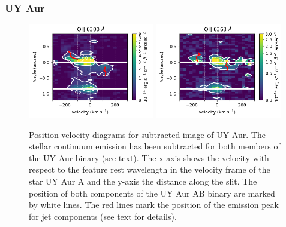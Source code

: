 \documentclass[twocolumn,trackchanges]{aastex63}
\begin{document}
\subsubsection{UY Aur}
\begin{figure}[h!]
\begin{center}
\includegraphics[width=0.49\textwidth]{UY_Aur_6300.png}
\includegraphics[width=0.49\textwidth]{UY_Aur_6363.png}
\caption{Position velocity diagrams for subtracted
image of UY Aur. The stellar continuum emission has been subtracted for both members of the UY Aur binary (see text). The x-axis shows the velocity with respect to the
feature rest wavelength in the velocity frame of the star UY Aur
A and the y-axis the distance along the slit. The position of both components of the UY Aur AB
binary are marked by white lines. The red lines mark the position of the emission peak for jet components (see text for details).
\label{fig:UYAur}
}
\end{center}
\end{figure}
\end{document}
